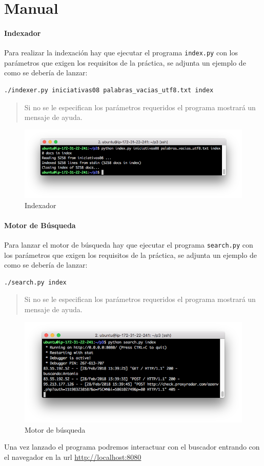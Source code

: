 \chapter{Manual}

\subsubsection{Indexador}

Para realizar la indexación hay que ejecutar el programa
\texttt{index.py} con los parámetros que exigen los requisitos de la
práctica, se adjunta un ejemplo de como se debería de lanzar:

\begin{lstlisting}
./indexer.py iniciativas08 palabras_vacias_utf8.txt index
\end{lstlisting}

\begin{quote}
Si no se le especifican los parámetros requeridos el programa mostrará
un mensaje de ayuda.
\end{quote}

\begin{figure}
\centering
\includegraphics[width=1.0\textwidth]{../images/index.png}
\caption{Indexador}
\end{figure}

\subsubsection{Motor de Búsqueda}

Para lanzar el motor de búsqueda hay que ejecutar el programa
\texttt{search.py} con los parámetros que exigen los requisitos de la
práctica, se adjunta un ejemplo de como se debería de lanzar:

\begin{lstlisting}
./search.py index
\end{lstlisting}

\begin{quote}
Si no se le especifican los parámetros requeridos el programa mostrará
un mensaje de ayuda.
\end{quote}

\begin{figure}
\centering
\includegraphics[width=1.0\textwidth]{../images/search.png}
\caption{Motor de búsqueda}
\end{figure}

Una vez lanzado el programa podremos interactuar con el buscador
entrando con el navegador en la url \url{http://localhost:8080}